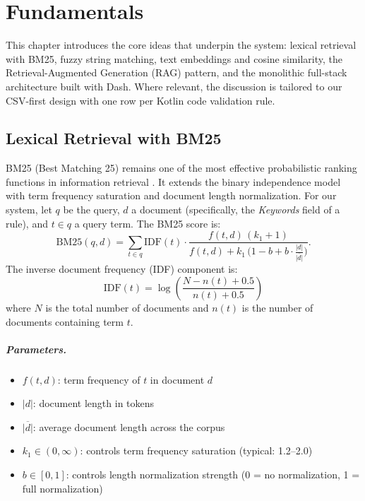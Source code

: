 \chapter{Fundamentals}
\label{ch:fundamentals}

This chapter introduces the core ideas that underpin the system: lexical retrieval with BM25, fuzzy string matching, text embeddings and cosine similarity, the Retrieval-Augmented Generation (RAG) pattern, and the monolithic full-stack architecture built with Dash. Where relevant, the discussion is tailored to our CSV-first design with one row per Kotlin code validation rule.

\section{Lexical Retrieval with BM25}
BM25 (Best Matching 25) remains one of the most effective probabilistic ranking functions in information retrieval \cite{bm25-robertson2009, robertson1994okapi}. It extends the binary independence model with term frequency saturation and document length normalization. For our system, let $q$ be the query, $d$ a document (specifically, the \emph{Keywords} field of a rule), and $t \in q$ a query term. The BM25 score is:
\[
\mathrm{BM25}(q,d) = \sum_{t \in q} \mathrm{IDF}(t) \cdot 
\frac{f(t,d)\,(k_1 + 1)}{f(t,d) + k_1 \,\big(1 - b + b \cdot \frac{|d|}{\overline{|d|}}\big)}.
\]
The inverse document frequency (IDF) component is:
\[
\mathrm{IDF}(t) = \log\left(\frac{N - n(t) + 0.5}{n(t) + 0.5}\right)
\]
where $N$ is the total number of documents and $n(t)$ is the number of documents containing term $t$.

\paragraph{Parameters.} 
\begin{itemize}[leftmargin=*,itemsep=2pt,topsep=2pt]
 \item $f(t,d)$: term frequency of $t$ in document $d$
 \item $|d|$: document length in tokens
 \item $\overline{|d|}$: average document length across the corpus
 \item $k_1 \in (0, \infty)$: controls term frequency saturation (typical: 1.2--2.0)
 \item $b \in [0,1]$: controls length normalization strength (0 = no normalization, 1 = full normalization)
\end{itemize}

